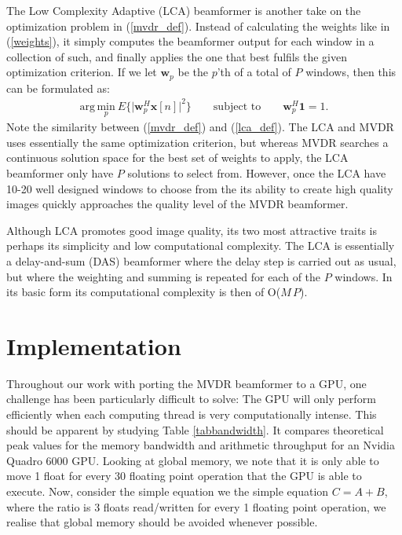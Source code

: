 \documentclass[
a4paper,10pt
]{ica2013_2}
\newcommand\argmin[1]{\text{arg}\,\underset{#1}{\text{min}}}
\renewcommand\H{^{\scriptscriptstyle H}}
\renewcommand\vec[1]{\boldsymbol{#1}}
\newcommand\1{\vec 1}
\newcommand*\w{\vec w}
\newcommand*\x{\vec x}
\begin{document}
The Low Complexity Adaptive (LCA) beamformer is another take on the optimization problem in (\ref{mvdr_def}). Instead of calculating the weights like in (\ref{weights}), it simply computes the beamformer output for each window in a collection of such, and finally applies the one that best fulfils the given optimization criterion. If we let $\w_p$ be the $p$'th of a total of $P$ windows, then this can be formulated as:
\begin{gather}
\argmin{p}\ E\Big\{\big|\w_p\H\x[n]\big|^2\Big\} \qquad\text{subject to}\qquad \w_p\H\1 = 1. \label{lca_def}
\end{gather}
Note the similarity between (\ref{mvdr_def}) and (\ref{lca_def}). The LCA and MVDR uses essentially the same optimization criterion, but whereas MVDR searches a continuous solution space for the best set of weights to apply, the LCA beamformer only have $P$ solutions to select from. However, once the LCA have 10-20 well designed windows to choose from the its ability to create high quality images quickly approaches the quality level of the MVDR beamformer.

Although LCA promotes good image quality, its two most attractive traits is perhaps its simplicity and low computational complexity. The LCA is essentially a delay-and-sum (DAS) beamformer where the delay step is carried out as usual, but where the weighting and summing is repeated for each of the $P$ windows. In its basic form its computational complexity is then of O($M\,P$).


\section{Implementation}\label{implementation}


Throughout our work with porting the MVDR beamformer to a GPU, one challenge has been particularly difficult to solve: The GPU will only perform efficiently when each computing thread is very computationally intense. This should be apparent by studying Table \ref{tabbandwidth}. It compares theoretical peak values for the memory bandwidth and arithmetic throughput for an Nvidia Quadro 6000 GPU. Looking at global memory, we note that it is only able to move 1 float for every 30 floating point operation that the GPU is able to execute. Now, consider the simple equation we the simple equation $C=A+B$, where the ratio is 3 floats read/written for every 1 floating point operation, we realise that global memory should be avoided whenever possible.
\end{document}
